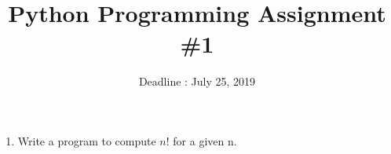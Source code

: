 \documentclass{article}
\begin{document}
\title{Python Programming Assignment \#1}
\author{Deadline : July 25, 2019}
\date{\vspace{-5ex}}

\maketitle

\begin{enumerate}
\item Write a program to compute $n!$ for a given n.
\end {enumerate}
\end{document}

